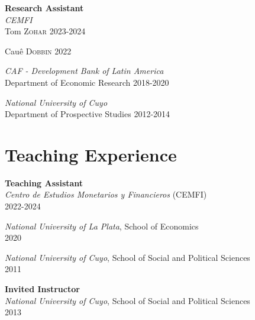 \documentclass[margin,center,a4paper]{res}
\begin{document}
\begin{resume}
\textbf{Research Assistant} \\
{\sl CEMFI} \\
\hspace*{0.3in} Tom \textsc{Zohar} \hfill 2023-2024\vspace{-0.75em}

\hspace*{0.3in} Cauê \textsc{Dobbin} \hfill 2022\vspace{-0.75em}

{\sl CAF - Development Bank of Latin America} \\
\hspace*{0.3in} Department of Economic Research \hfill 2018-2020\vspace{-0.75em}

{\sl National University of Cuyo} \\
\hspace*{0.3in} Department of Prospective Studies \hfill 2012-2014
\section{Teaching Experience}
\textbf{Teaching Assistant} \\
\textit{Centro de Estudios Monetarios y Financieros} (CEMFI) \\
\hspace*{0.3in}   \hfill 2022-2024\vspace{-0.75em}

\textit{National University of La Plata}, School of Economics \\
\hspace*{0.3in}   \hfill 2020\vspace{-0.75em}

\textit{National University of Cuyo}, School of Social and Political Sciences \\
\hspace*{0.3in}    \hfill 2011

\textbf{Invited Instructor} \\
\textit{National University of Cuyo}, School of Social and Political Sciences \\
\hspace*{0.3in}   \hfill 2013


\end{resume}
\end{document}
